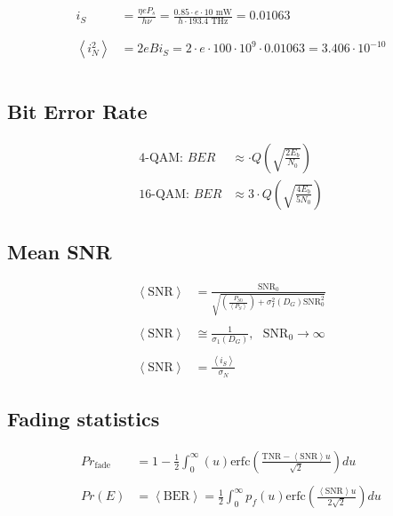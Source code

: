\documentclass[a4paper]{article}
\begin{document}
\begin{align*}
i_S &= \frac{\eta e P_s}{h\nu} = \frac{0.85\cdot e \cdot 10 \textrm{ mW}}{h\cdot 193.4 \textrm{ THz}} = 0.01063\\
\\
\\
\left\langle i_N^2 \right\rangle &= 2eBi_S = 2\cdot e \cdot 100\cdot 10^{9}\cdot 0.01063 = 3.406\cdot 10^{-10}
\\
\\
\end{align*}


\subsection{Bit Error Rate}
\begin{align*}
\textrm{4-QAM:   } BER &\approx \cdot Q\left(\sqrt{\frac{2E_b}{N_0}}\right)\\
\textrm{16-QAM:   }BER &\approx 3\cdot Q\left(\sqrt{\frac{4E_b}{5N_0}}\right)
\end{align*}

\subsection{Mean SNR}
\begin{align*}
\left\langle\textrm{SNR}\right\rangle &= \frac{\textrm{SNR}_0}{\sqrt{\left(\frac{P_{S0}}{\left\langle P_S\right\rangle}\right)+\sigma_I^2(D_G)\textrm{SNR}_0^2}}
\\
\\
\left\langle\textrm{SNR}\right\rangle &\cong \frac{1}{\sigma_1(D_G)}, \ \ \ \textrm{SNR}_0 \rightarrow \infty
\\
\\
\left\langle\textrm{SNR}\right\rangle &= \frac{\left\langle i_S \right\rangle}{\sigma_N}
\end{align*}

\subsection{Fading statistics}
\begin{align*}
Pr_{\textrm{fade}} &= 1 -\frac{1}{2}\int_0^\infty (u)\textrm{erfc}\left(\frac{\textrm{TNR}-\left\langle \textrm{SNR}\right\rangle u}{\sqrt{2}}\right)du
\\
\\
Pr(E) &= \left\langle \textrm{BER} \right\rangle = \frac{1}{2}\int_0^\infty p_f(u)\textrm{erfc}\left(\frac{\left\langle \textrm{SNR}\right\rangle u}{2\sqrt{2}}\right)du
\end{align*}
\end{document}
